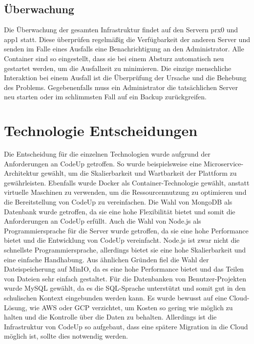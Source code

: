 \documentclass[main.tex]{subfiles}
\begin{document}
    \subsection{Überwachung}
    Die Überwachung der gesamten Infrastruktur findet auf den Servern prx0 und app1 statt.
    Diese überprüfen regelmäßig die Verfügbarkeit der anderen Server und senden im Falle eines Ausfalls eine Benachrichtigung an den Administrator.
    Alle Container sind so eingestellt, dass sie bei einem Absturz automatisch neu gestartet werden, um die Ausfallzeit zu minimieren.
    Die einzige menschliche Interaktion bei einem Ausfall ist die Überprüfung der Ursache und die Behebung des Problems.
    Gegebenenfalls muss ein Administrator die tatsächlichen Server neu starten oder im schlimmsten Fall auf ein Backup zurückgreifen.
    \section{Technologie Entscheidungen}
    Die Entscheidung für die einzelnen Technologien wurde aufgrund der Anforderungen an CodeUp getroffen.
    So wurde beispielsweise eine Microservice-Architektur gewählt, um die Skalierbarkeit und Wartbarkeit der Plattform zu gewährleisten.
    Ebenfalls wurde Docker als Container-Technologie gewählt, anstatt virtuelle Maschinen zu verwenden, um die Ressourcennutzung zu optimieren und die Bereitstellung von CodeUp zu vereinfachen.
    Die Wahl von MongoDB als Datenbank wurde getroffen, da sie eine hohe Flexibilität bietet und somit die Anforderungen an CodeUp erfüllt.
    Auch die Wahl von Node.js als Programmiersprache für die Server wurde getroffen, da sie eine hohe Performance bietet und die Entwicklung von CodeUp vereinfacht.
    Node.js ist zwar nicht die schnellste Programmiersprache, allerdings bietet sie eine hohe Skalierbarkeit und eine einfache Handhabung.
    Aus ähnlichen Gründen fiel die Wahl der Dateispeicherung auf MinIO, da es eine hohe Performance bietet und das Teilen von Dateien sehr einfach gestaltet.
    Für die Datenbanken von Benutzer-Projekten wurde MySQL gewählt, da es die SQL-Sprache unterstützt und somit gut in den schulischen Kontext eingebunden werden kann.
    Es wurde bewusst auf eine Cloud-Lösung, wie AWS oder GCP verzichtet, um Kosten so gering wie möglich zu halten und die Kontrolle über die Daten zu behalten.
    Allerdings ist die Infrastruktur von CodeUp so aufgebaut, dass eine spätere Migration in die Cloud möglich ist, sollte dies notwendig werden.
\end{document}
